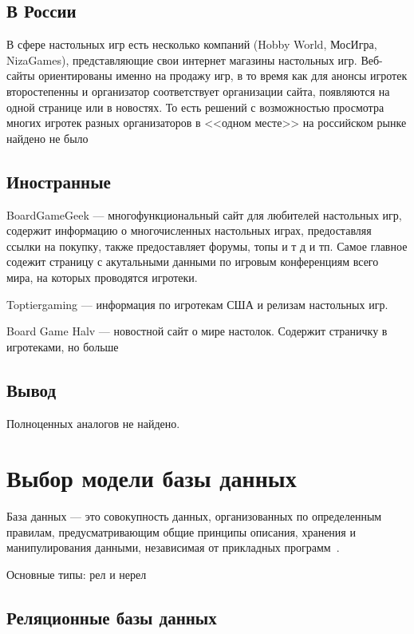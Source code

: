 \subsection{В России}

В сфере настольных игр есть несколько компаний (Hobby World, МосИгра,
NizaGames), представляющие свои интернет магазины настольных игр. Веб-сайты
ориентированы именно на продажу игр, в то время как для анонсы игротек
второстепенны и организатор соответствует организации сайта, появляются на одной
странице или в новостях. То есть решений с возможностью просмотра многих игротек
разных организаторов в <<одном месте>> на российском рынке найдено не было

\subsection{Иностранные}

BoardGameGeek --- многофункциональный сайт для любителей настольных игр,
содержит информацию о многочисленных настольных играх, предоставляя ссылки на
покупку, также предоставляет форумы, топы и т д и тп. Самое главное содежит
страницу с акутальными данными по игровым конференциям всего мира, на которых
проводятся игротеки.

Toptiergaming --- информация по игротекам США и релизам настольных игр.

Board Game Halv --- новостной сайт о мире настолок. Содержит страничку в
игротеками, но больше

\subsection{Вывод}

Полноценных аналогов не найдено.

\section{Выбор модели базы данных}

База данных --- это совокупность данных, организованных по определенным
правилам, предусматривающим общие принципы описания, хранения и манипулирования
данными, независимая от прикладных программ~\cite{gost01}.

Основные типы: рел и нерел

\subsection{Реляционные базы данных}

